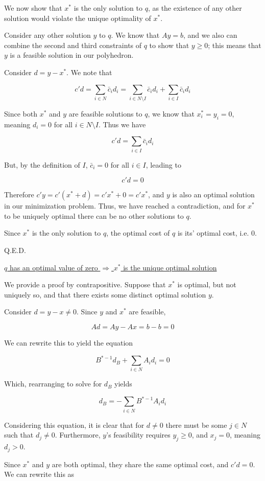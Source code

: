 \documentclass[11pt,a4paper]{article}
\begin{document}
We now show that $x^*$ is the only solution to $q$, as the existence of any other solution would violate the unique optimality of $x^*$.

Consider any other solution $y$ to $q$. We know that $Ay=b$, and we also can combine the second and third constraints of $q$ to show that $y\geq 0$; this means that $y$ is a feasible solution in our polyhedron.

Consider $d=y-x^*$. We note that 

$$
c'd=\sum_{i\in N}\bar{c}_id_i=\sum_{i\in N\texttt{\textbackslash}I}\bar{c}_id_i+\sum_{i\in I}\bar{c}_id_i
$$

Since both $x^*$ and $y$ are feasible solutions to $q$, we know that $x^*_i=y_i=0$, meaning $d_i=0$ for all $i\in N\texttt{\textbackslash}I$. Thus we have 

$$
c'd=\sum_{i\in I}\bar{c}_id_i
$$

But, by the definition of $I$, $\bar{c}_i=0$ for all $i\in I$, leading to

$$
c'd = 0
$$

Therefore $c'y=c'(x^*+d)=c'x^*+0=c'x^*$, and $y$ is also an optimal solution in our minimization problem. Thus, we have reached a contradiction, and for $x^*$ to be uniquely optimal there can be no other solutions to $q$.

Since $x^*$ is the only solution to $q$, the optimal cost of $q$ is its' optimal cost, i.e. 0.

Q.E.D.

\underline{$q$ has an optimal value of zero $\Rightarrow$ $x^*$ is the unique optimal solution }

We provide a proof by contrapositive. Suppose that $x^*$ is optimal, but not uniquely so, and that there exists some distinct optimal solution $y$.

Consider $d=y-x\neq 0$. Since $y$ and $x^*$ are feasible, 

$$
Ad=Ay-Ax=b-b=0
$$

We can rewrite this to yield the equation

$$
B^{*-1}d_B+\sum_{i\in N}A_id_i=0
$$

Which, rearranging to solve for $d_B$ yields

$$
d_B=-\sum_{i\in N}B^{*-1}A_id_i
$$

Considering this equation, it is clear that for $d\neq 0$ there must be some $j\in N$ such that $d_j\neq0$. Furthermore, $y$'s feasibility requires $y_j\geq 0$, and $x_j=0$, meaning $d_j>0$.

Since $x^*$ and $y$ are both optimal, they share the same optimal cost, and $c'd=0$. We can rewrite this as
\end{document}

